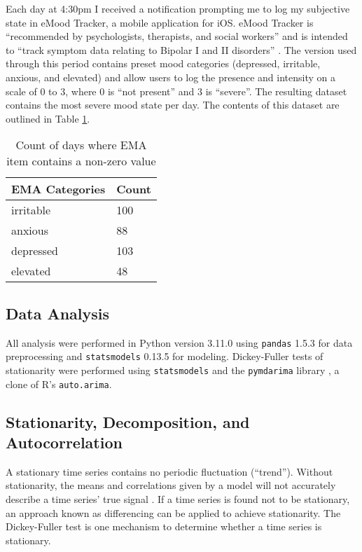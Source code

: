 \documentclass[9pt]{article}
\begin{document}
Each day at 4:30pm I received a notification prompting me to log my subjective
state in eMood Tracker, a mobile application for iOS. eMood Tracker is
``recommended by psychologists, therapists, and social workers'' and is
intended to ``track symptom data relating to Bipolar I and II disorders''
\citep{eMoods2023}. The version used through this period contains preset mood
categories (depressed, irritable, anxious, and elevated) and allow users to log
the presence and intensity on a scale of 0 to 3, where 0 is ``not present'' and
3 is ``severe''. The resulting dataset contains the most severe mood state per
day. The contents of this dataset are outlined in Table \ref{EMA}.

\begin{table} \centering \begin{tabular}{ll} \toprule \textbf{EMA Categories} &
\textbf{Count} \\ \midrule irritable & 100 \\ anxious & 88  \\ depressed & 103
\\ elevated & 48  \\ \bottomrule \end{tabular} \caption{Count of days where EMA
item contains a non-zero value} \label{EMA} \end{table}


\subsection{Data Analysis}\label{data-analysis}

All analysis were performed in Python version 3.11.0 \citep{Python} using
\texttt{pandas} 1.5.3 \citep{reback2020pandas} for data preprocessing and
\texttt{statsmodels} 0.13.5 \citep{seabold2010statsmodels} for modeling.
Dickey-Fuller tests of stationarity were performed using \texttt{statsmodels}
and the \texttt{pymdarima} library \citep{pmdarima}, a clone of R's
\texttt{auto.arima}.

\subsection{Stationarity, Decomposition, and
Autocorrelation}\label{stationarity-decomposition-and-autocorrelation}

A stationary time series contains no periodic fluctuation (``trend''). Without
stationarity, the means and correlations given by a model will not accurately
describe a time series' true signal \citep{boseVector2017}. If a time series is
found not to be stationary, an approach known as differencing can be applied to
achieve stationarity. The Dickey-Fuller test is one mechanism to determine
whether a time series is stationary.
\end{document}
